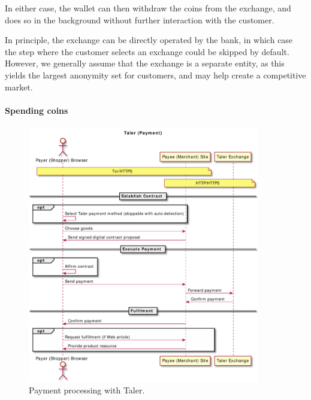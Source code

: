 \documentclass{IEEEtran}
\begin{document}
In either case, the wallet can then withdraw the coins from the
exchange, and does so in the background without further interaction
with the customer.

In principle, the exchange can be directly operated by the bank, in
which case the step where the customer selects an exchange could be
skipped by default.  However, we generally assume that the exchange is
a separate entity, as this yields the largest anonymity set for
customers, and may help create a competitive market.

\paragraph{Spending coins}

\begin{figure}
\includegraphics[width=0.9\textwidth]{figs/taler-pay.pdf}
\caption{Payment processing with Taler.}
\label{fig:taler-pay}
\end{figure}
\end{document}

